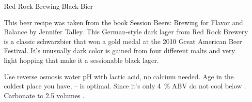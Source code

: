 \stylesection{\styleschwarzbier}

\begin{recipie}{Red Rock Brewing Black Bier}

\begin{aboutblock}
This beer recipe was taken from the book Session Beers: Brewing for Flavor and Balance by
Jennifer Talley. This German-style dark lager from Red Rock Brewery is a classic schwarzbier
that won a gold medal at the 2010 Great American Beer Festival. It's unusually dark color
is gained from four different malts and very light hopping that make it a sessionable
black lager.
\end{aboutblock}


\begin{methodandtiming}
 
\begin{mashsteps}
\end{mashsteps}

\begin{fermentationsteps}
\end{fermentationsteps}

\begin{directions}
Use reverse osmosis water pH with lactic acid, no calcium needed.
Age in the coldest place you have, -- is optimal. Since it's
only 4~\% ABV do not cool below . Carbonate to 2.5 volumes .
\end{directions}

\end{methodandtiming}

\pagebreak

\begin{ingredientsblock}

\begin{malts}
\end{malts}

\begin{hops}
\end{hops}

\begin{yeasts}
\end{yeasts}

\end{ingredientsblock}

\end{recipie}

